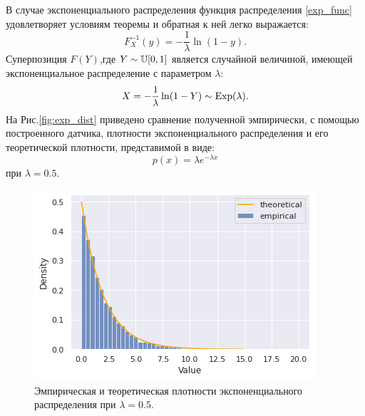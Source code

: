 В случае экспоненциального распределения функция распределения \eqref{exp_func}
 удовлетворяет условиям теоремы и обратная к ней легко выражается:
$$
    F_X^{-1}(y) = -\frac{1}{\lambda} \ln(1 - y).
$$
Суперпозиция $ F(Y) $,где $ Y \sim \operatorname{\mathbb{U}}[0,1] $ является случайной величиной,
 имеющей экспоненциальное распределение с параметром $ \lambda $:
$$
 X = -\frac{1}{\lambda} \ln(1 - Y) \sim \operatorname{\mathrm{Exp}}(\lambda).
$$
На Рис.\eqref{fig:exp_dist} приведено сравнение полученной эмпирически,
 с помощью построенного датчика, плотности экспоненциального распределения
 и его теоретической плотности, представимой в виде:
$$
p(x) = \lambda e^{-\lambda x}
$$
при $ \lambda = 0.5 $.

 \begin{figure}[ht]
	\centering
	\includegraphics[width = 0.8\linewidth]{"./resources/exp_dist.png"}
	\caption{Эмпирическая и теоретическая плотности экспоненциального
     распределения при $ \lambda = 0.5 $.}
    \label{fig:exp_dist}
\end{figure}

